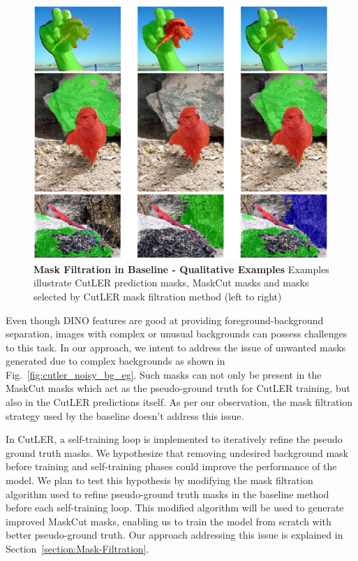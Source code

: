 \begin{figure}
	\centering
	\includegraphics[width=1\textwidth]{Images/main/filtered_mask_problem.png}
	\caption[\textbf{Mask Filtration in Baseline - Qualitative Examples.}]{\textbf{Mask Filtration in Baseline - Qualitative Examples} Examples illustrate CutLER prediction masks, MaskCut masks and masks selected by CutLER mask filtration method (left to right)}
	\label{fig:filtered_mask_problem}
\end{figure}

Even though DINO features are good at providing foreground-background separation, images with complex or unusual backgrounds can possess challenges to this task. In our approach, we intent to address the issue of unwanted masks generated due to complex backgrounds as shown in Fig.~\ref{fig:cutler_noisy_bg_eg}. Such masks can not only be present in the MaskCut masks which act as the pseudo-ground truth for CutLER training, but also in the CutLER predictions itself. As per our observation, the mask filtration strategy used by the baseline doesn't address this issue.

In CutLER, a self-training loop is implemented to iteratively refine the pseudo ground truth masks. We hypothesize that removing undesired background mask before training and self-training phases could improve the performance of the model. We plan to test this hypothesis by modifying the mask filtration algorithm used to refine pseudo-ground truth masks in the baseline method before each self-training loop. This modified algorithm will be used to generate improved MaskCut masks, enabling us to train the model from scratch with better pseudo-ground truth. Our approach addressing this issue is explained in Section~\ref{section:Mask-Filtration}.


